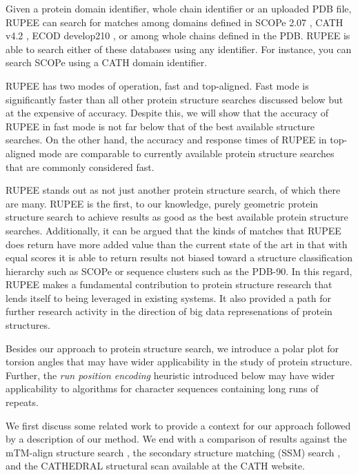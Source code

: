 \documentclass[letter,center,fleqn]{NAR}
\begin{document}
Given a protein domain identifier, whole chain identifier or an uploaded PDB file, RUPEE can search for matches among domains defined in SCOPe 2.07 \cite{Fox2013}, CATH v4.2 \cite{Orengo1997}, ECOD develop210 \cite{Cheng2014}, or among whole chains defined in the PDB.
RUPEE is able to search either of these databases using any identifier. 
For instance, you can search SCOPe using a CATH domain identifier. 

RUPEE has two modes of operation, fast and top-aligned. 
Fast mode is significantly faster than all other protein structure searches discussed below but at the expensive of accuracy.
Despite this, we will show that the accuracy of RUPEE in fast mode is not far below that of the best available structure searches. 
On the other hand, the accuracy and response times of RUPEE in top-aligned mode are comparable to currently available protein structure searches that are commonly considered fast. 

RUPEE stands out as not just another protein structure search, of which there are many. 
RUPEE is the first, to our knowledge, purely geometric protein structure search to achieve results as good as the best available protein structure searches. 
Additionally, it can be argued that the kinds of matches that RUPEE does return have more added value than the current state of the art in that with equal scores it is able to return results not biased toward a structure classification hierarchy such as SCOPe or sequence clusters such as the PDB-90. 
In this regard, RUPEE makes a fundamental contribution to protein structure research that lends itself to being leveraged in existing systems. 
It also provided a path for further research activity in the direction of big data represenations of protein structures. 

Besides our approach to protein structure search, we introduce a polar plot for torsion angles that may have wider applicability in the study of protein structure. 
Further, the \emph{run position encoding} heuristic introduced below may have wider applicability to algorithms for character sequences containing long runs of repeats. 

We first discuss some related work to provide a context for our approach followed by a description of our method. 
We end with a comparison of results against the mTM-align structure search \cite{Dong2018}, the secondary structure matching (SSM) search \cite{Krissinel2004}, and the CATHEDRAL structural scan \cite{Redfern2007} available at the CATH website.
\end{document}
